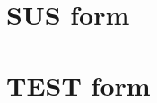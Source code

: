 \documentclass[12pt,a4paper,oneside,pdftex]{report}
\begin{document}
% 



\appendix
% 
\chapter{SUS form}
\label{chapter:susform}

\chapter{TEST form}
\label{chapter:nasaltxform}    




\end{document}
